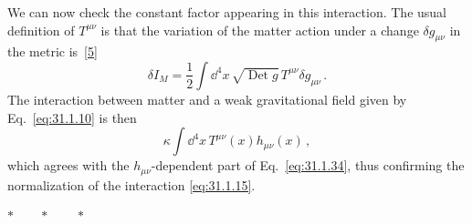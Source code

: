 We can now check the constant factor appearing in this interaction. The usual
definition of \(T^{\mu\nu}\) is that the variation of the matter action under
a change \(\delta g_{\mu\nu}\) in the metric
is~\hyperref[ch31-ref-5]{[5]}
\[
  \delta I_M
  =\frac12\int \dd^4x\,\sqrt{\operatorname{Det}g}\,
    T^{\mu\nu}\delta g_{\mu\nu}\,.
\]
The interaction between matter and a weak gravitational field given by
Eq.~\eqref{eq:31.1.10} is then
\[
  \kappa\int \dd^4x\,T^{\mu\nu}(x)h_{\mu\nu}(x)\,,
\]
which agrees with the \(h_{\mu\nu}\)-dependent part of
Eq.~\eqref{eq:31.1.34}, thus confirming the normalization of the interaction
\eqref{eq:31.1.15}.

\begin{center}
\(\ast\qquad\ast\qquad\ast\)
\end{center}


